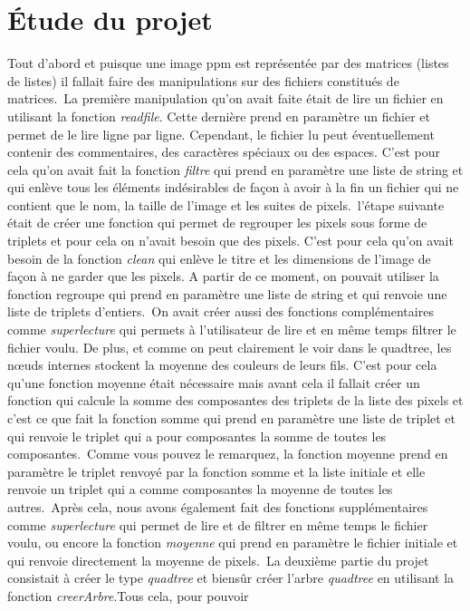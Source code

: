 \documentclass[12pt]{article}
\begin{document}
\section{Étude du projet}
Tout d'abord et puisque une image ppm est représentée par des matrices (listes de listes) il fallait faire des manipulations sur des fichiers constitués de matrices.\
La première manipulation qu'on avait faite était de lire un fichier en utilisant la fonction \textit{readfile}. Cette dernière prend en paramètre un fichier et permet de le lire ligne par ligne. Cependant, le fichier lu peut éventuellement contenir des commentaires, des caractères spéciaux ou des espaces. C'est pour cela qu'on avait fait la fonction \textit{filtre} qui prend en paramètre une liste de string et qui enlève tous les éléments indésirables de façon à avoir à la fin un fichier qui ne contient que le nom, la taille de l'image et les suites de pixels.\
l'étape suivante était de créer une fonction qui permet de regrouper les pixels sous forme de triplets et pour cela on n'avait besoin que des pixels. C'est pour cela qu'on avait besoin de la fonction 
\textit{clean} qui enlève le titre et les dimensions de l'image de façon à ne garder que les pixels. A partir de ce moment, on pouvait utiliser la fonction regroupe qui prend en paramètre une liste de string et qui renvoie une liste de triplets d'entiers.\
On avait créer aussi des fonctions complémentaires comme \textit{superlecture} qui permets à l'utilisateur de lire et en même temps filtrer le fichier voulu. De plus, et comme on peut clairement le voir dans le quadtree, les nœuds internes stockent la moyenne des couleurs de leurs fils. C'est pour cela qu'une fonction moyenne était nécessaire mais avant cela il fallait créer un fonction qui calcule la somme des composantes des triplets de la liste des pixels et c'est ce que fait la fonction somme qui prend en paramètre une liste de triplet et qui renvoie le triplet
qui a pour composantes la somme de toutes les composantes.\
Comme vous pouvez le remarquez, la fonction moyenne prend en paramètre le triplet renvoyé par la fonction somme et la liste initiale et elle renvoie un triplet qui a comme composantes la moyenne de toutes les autres.\
Après cela, nous avons également fait des fonctions supplémentaires comme \textit{superlecture} qui permet de lire et de filtrer en même temps le fichier voulu, ou encore la fonction \textit{moyenne}
qui prend en paramètre le fichier initiale et qui renvoie directement la moyenne de pixels.\
La deuxième partie du projet consistait à créer le type \textit{quadtree} et biensûr créer l'arbre \textit{quadtree} en utilisant la fonction \textit{creerArbre}.Tous cela, pour pouvoir 
\end{document}
